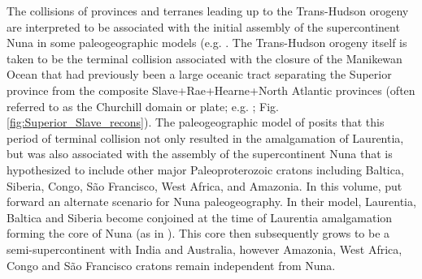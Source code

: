 \documentclass[twocolumn, switch]{article} %
\begin{document}
The collisions of provinces and terranes leading up to the Trans-Hudson orogeny are interpreted to be associated with the initial assembly of the supercontinent Nuna in some paleogeographic models (e.g. \citealp{Zhang2012a,Pehrsson2015a}. The Trans-Hudson orogeny itself is taken to be the terminal collision associated with the closure of the Manikewan Ocean that had previously been a large oceanic tract separating the Superior province from the composite Slave+Rae+Hearne+North Atlantic provinces (often referred to as the Churchill domain or plate; e.g. \citealp{Skipton2016a, Weller2017a}; Fig. \ref{fig:Superior_Slave_recons}). The paleogeographic model of \cite{Pehrsson2015a} posits that this period of terminal collision not only resulted in the amalgamation of Laurentia, but was also associated with the assembly of the supercontinent Nuna that is hypothesized to include other major Paleoproterozoic cratons including Baltica, Siberia, Congo, S\~ao Francisco, West Africa, and Amazonia. In this volume, \cite{Elming2021a} put forward an alternate scenario for Nuna paleogeography. In their model,  Laurentia, Baltica and Siberia become conjoined at the time of Laurentia amalgamation forming the core of Nuna (as in \citealp{Evans2011a}). This core then subsequently grows to be a semi-supercontinent with India and Australia, however Amazonia, West Africa, Congo and S\~ao Francisco cratons remain independent from Nuna.
\end{document}
